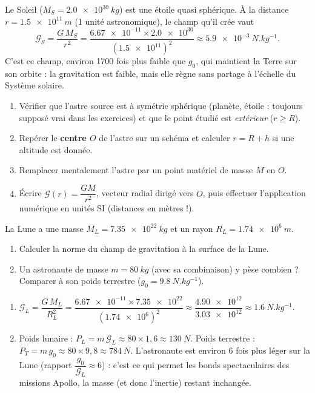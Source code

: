 \documentclass[11pt]{article}
\begin{document}
\begin{exemplebox}
Le Soleil ($M_S = \SI{2,0e30}{kg}$) est une étoile quasi sphérique. À la distance $r = \SI{1,5e11}{m}$ (1 unité astronomique), le champ qu'il crée vaut
\[
\mathcal{G}_S = \frac{G\,M_S}{r^{2}} = \frac{\num{6,67e-11} \times \num{2,0e30}}{(\num{1,5e11})^{2}} \approx \SI{5,9e-3}{N.kg^{-1}}.
\]
C'est ce champ, environ 1700 fois plus faible que $g_0$, qui maintient la Terre sur son orbite : la gravitation est faible, mais elle règne sans partage à l'échelle du Système solaire.
\end{exemplebox}

\begin{methode}
\begin{enumerate}
\item Vérifier que l'astre source est à symétrie sphérique (planète, étoile : toujours supposé vrai dans les exercices) et que le point étudié est \emph{extérieur} ($r \geq R$).
\item Repérer le \textbf{centre $O$} de l'astre sur un schéma et calculer $r = R + h$ si une altitude est donnée.
\item Remplacer mentalement l'astre par un point matériel de masse $M$ en $O$.
\item Écrire $\mathcal{G}(r) = \dfrac{GM}{r^{2}}$, vecteur radial dirigé vers $O$, puis effectuer l'application numérique en unités SI (distances en mètres !).
\end{enumerate}
\end{methode}

\begin{exercice}
La Lune a une masse $M_L = \SI{7,35e22}{kg}$ et un rayon $R_L = \SI{1,74e6}{m}$.
\begin{enumerate}
\item Calculer la norme du champ de gravitation à la surface de la Lune.
\item Un astronaute de masse $m = \SI{80}{kg}$ (avec sa combinaison) y pèse combien ? Comparer à son poids terrestre ($g_0 = \SI{9,8}{N.kg^{-1}}$).
\end{enumerate}
\end{exercice}

\begin{corrige}
\begin{enumerate}
\item $\mathcal{G}_L = \dfrac{G\,M_L}{R_L^{2}} = \dfrac{\num{6,67e-11} \times \num{7,35e22}}{(\num{1,74e6})^{2}} \approx \dfrac{\num{4,90e12}}{\num{3,03e12}} \approx \SI{1,6}{N.kg^{-1}}$.
\item Poids lunaire : $P_L = m\,\mathcal{G}_L \approx 80 \times 1,6 \approx \SI{130}{N}$. Poids terrestre : $P_T = m\,g_0 \approx 80 \times 9,8 \approx \SI{784}{N}$. L'astronaute est environ 6 fois plus léger sur la Lune (rapport $\dfrac{g_0}{\mathcal{G}_L} \approx 6$) : c'est ce qui permet les bonds spectaculaires des missions Apollo, la masse (et donc l'inertie) restant inchangée.
\end{enumerate}
\end{corrige}
\end{document}

